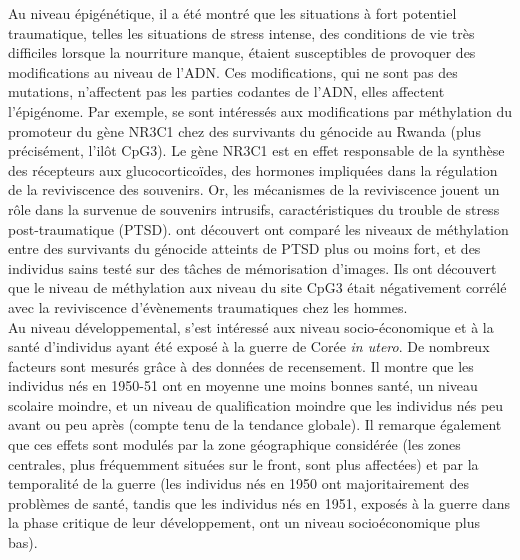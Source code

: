 \documentclass[french]{article}
\begin{document}
			Au niveau épigénétique, il a été montré que les situations à fort potentiel traumatique, telles les situations de stress intense, des conditions de vie très difficiles lorsque la nourriture manque, étaient susceptibles de provoquer des modifications au niveau de l'ADN. Ces modifications, qui ne sont pas des mutations, n'affectent pas les parties codantes de l'ADN, elles affectent l'épigénome. Par exemple, \cite{vukojevic2014} se sont intéressés aux modifications par méthylation du promoteur du gène NR3C1 chez des survivants du génocide au Rwanda (plus précisément, l'ilôt CpG3). Le gène NR3C1 est en effet responsable de la synthèse des récepteurs aux glucocorticoïdes, des hormones impliquées dans la régulation de la reviviscence des souvenirs. Or, les mécanismes de la reviviscence jouent un rôle dans la survenue de souvenirs intrusifs, caractéristiques du trouble de stress post-traumatique (PTSD). \cite{vukojevic2014} ont découvert ont comparé les niveaux de méthylation entre des survivants du génocide atteints de PTSD plus ou moins fort, et des individus sains testé sur des tâches de mémorisation d'images. Ils ont découvert que le niveau de méthylation aux niveau du site CpG3 était négativement corrélé avec la reviviscence d'évènements traumatiques chez les hommes.\\
			
			Au niveau développemental, \cite{lee2014} s'est intéressé aux niveau socio-économique et à la santé d'individus ayant été exposé à la guerre de Corée \textit{in utero}. De nombreux facteurs sont mesurés grâce à des données de recensement. Il montre que les individus nés en 1950-51 ont en moyenne une moins bonnes santé, un niveau scolaire moindre, et un niveau de qualification moindre que les individus nés peu avant ou peu après (compte tenu de la tendance globale). Il remarque également que ces effets sont modulés par la zone géographique considérée (les zones centrales, plus fréquemment situées sur le front, sont plus affectées) et par la temporalité de la guerre (les individus nés en 1950 ont majoritairement des problèmes de santé, tandis que les individus nés en 1951, exposés à la guerre dans la phase critique de leur développement, ont un niveau socioéconomique plus bas).
			
\end{document}
